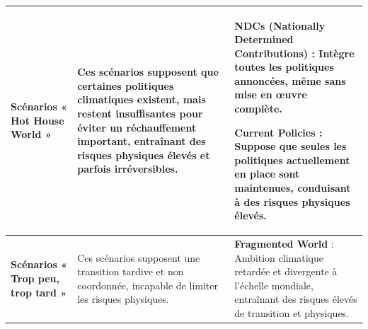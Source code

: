\documentclass[11pt,a4paper]{article}
\begin{document}
\begin{longtable}{>{\raggedright\arraybackslash}p{3.0cm} >{\raggedright\arraybackslash}p{4.0cm} >{\raggedright\arraybackslash}p{7.4cm}}
\midrule

\textbf{Scénarios « Hot House World »} &
Ces scénarios supposent que certaines politiques climatiques existent, mais restent insuffisantes pour éviter un réchauffement important, entraînant des risques physiques élevés et parfois irréversibles. &
\textbf{NDCs (Nationally Determined Contributions)} : Intègre toutes les politiques annoncées, même sans mise en œuvre complète.

\vspace{0.2cm}
\textbf{Current Policies} : Suppose que seules les politiques actuellement en place sont maintenues, conduisant à des risques physiques élevés. \\

\midrule

\textbf{Scénarios « Trop peu, trop tard »} &
Ces scénarios supposent une transition tardive et non coordonnée, incapable de limiter les risques physiques. &
\textbf{Fragmented World} : Ambition climatique retardée et divergente à l’échelle mondiale, entraînant des risques élevés de transition et physiques. \\

\end{longtable}
\end{document}
